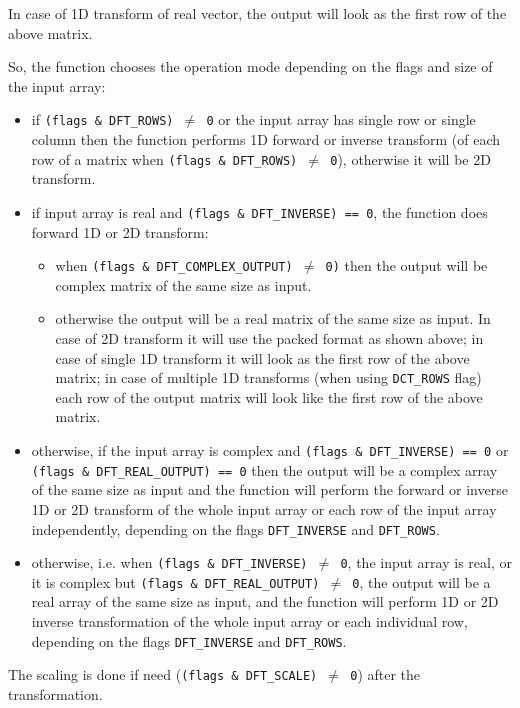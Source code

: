 In case of 1D transform of real vector, the output will look as the first row of the above matrix. 

So, the function chooses the operation mode depending on the flags and size of the input array:
\begin{itemize}
    \item if \texttt{(flags \& DFT\_ROWS) $\ne$ 0} or the input array has single row or single column then the function performs 1D forward or inverse transform (of each row of a matrix when \texttt{(flags \& DFT\_ROWS) $\ne$ 0}), otherwise it will be 2D transform.
    \item if input array is real and \texttt{(flags \& DFT\_INVERSE) == 0}, the function does forward 1D or 2D transform:
    \begin{itemize}
        \item when \texttt{(flags \& DFT\_COMPLEX\_OUTPUT) $\ne$ 0)} then the output will be complex matrix of the same size as input.
        \item otherwise the output will be a real matrix of the same size as input. In case of 2D transform it will use the packed format as shown above; in case of single 1D transform it will look as the first row of the above matrix; in case of multiple 1D transforms (when using \texttt{DCT\_ROWS} flag) each row of the output matrix will look like the first row of the above matrix.
    \end{itemize}
    \item otherwise, if the input array is complex and \texttt{(flags \& DFT\_INVERSE) == 0} or \texttt{(flags \& DFT\_REAL\_OUTPUT) == 0} then the output will be a complex array of the same size as input and the function will perform the forward or inverse 1D or 2D transform of the whole input array or each row of the input array independently, depending on the flags \texttt{DFT\_INVERSE} and \texttt{DFT\_ROWS}.
    \item otherwise, i.e. when \texttt{(flags \& DFT\_INVERSE) $\ne$ 0}, the input array is real, or it is complex but \texttt{(flags \& DFT\_REAL\_OUTPUT) $\ne$ 0}, the output will be a real array of the same size as input, and the function will perform 1D or 2D inverse transformation of the whole input array or each individual row, depending on the flags \texttt{DFT\_INVERSE} and \texttt{DFT\_ROWS}.
\end{itemize}

The scaling is done if need (\texttt{(flags \& DFT\_SCALE) $\ne$ 0}) after the transformation.


